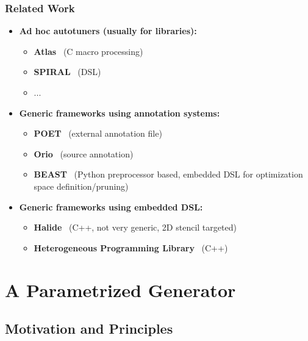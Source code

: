 \documentclass{beamer}
\begin{document}
\begin{frame}
  \frametitle{Related Work}

  \begin{itemize}
    \item \textbf{Ad hoc autotuners (usually for libraries):}
    \begin{itemize}
      \item \textbf{Atlas}~\cite{whaley04} (C macro processing)
      \item \textbf{SPIRAL}~\cite{puschel2004spiral} (DSL)
      \item ...
    \end{itemize}
    \item \textbf{Generic frameworks using annotation systems:}
    \begin{itemize}
      \item \textbf{POET}~\cite{yi2007poet} (external annotation file)
      \item \textbf{Orio}~\cite{Hart2009:Orio} (source annotation)
      \item \textbf{BEAST}~\cite{CPE:CPE3516} (Python preprocessor based, embedded DSL for optimization space definition/pruning)
    \end{itemize}
    \item \textbf{Generic frameworks using embedded DSL:}
    \begin{itemize}
      \item \textbf{Halide}~\cite{ragan2013halide} (C++, not very generic, 2D stencil targeted)
      \item \textbf{Heterogeneous Programming Library}~\cite{F.Fabeiro:2016:WPM:2894387.2894576} (C++)
    \end{itemize}
  \end{itemize}

\end{frame}

\section{A Parametrized Generator}

\subsection{Motivation and Principles}
\end{document}
